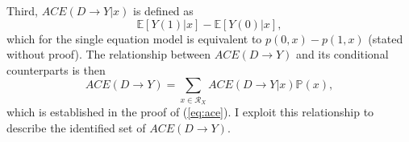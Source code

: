 \documentclass[10pt,a4paper,twoside]{article}
\DeclareRobustCommand{\stirling}{\genfrac\{\}{0pt}{}}
\numberwithin{equation}{section}
\begin{document}
Third, $ACE(D\rightarrow Y|x)$ is defined as 
\[\mathbb{E}[Y(1)|x]-\mathbb{E}[Y(0)|x],\]
which for the single equation model is equivalent to $p(0,x)-p(1,x)$ (stated without proof). The relationship between $ACE(D\rightarrow Y)$ and its conditional counterparts is then 
\begin{equation}
ACE(D\rightarrow Y)=\sum_{x\in\mathcal{R}_X}ACE(D\rightarrow Y|x)\mathbb{P}(x),\label{eq:relationship}
\end{equation}
which is established in the proof of (\ref{eq:ace}). I exploit this relationship to describe the identified set of $ACE(D\rightarrow Y)$.  
%
\end{document}
